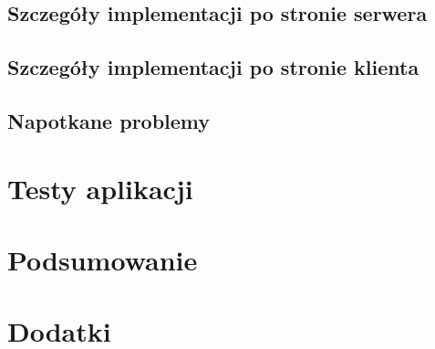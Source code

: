 \documentclass[polish]{inz}
\begin{document}
\section{Szczegóły implementacji po stronie serwera}
\label{sec:implementation_server}


\section{Szczegóły implementacji po stronie klienta}


\section{Napotkane problemy}
\label{sec:napotkane_problemy}


\chapter{Testy aplikacji}


\chapter{Podsumowanie}


\chapter{Dodatki}


\printindex
\end{document}
